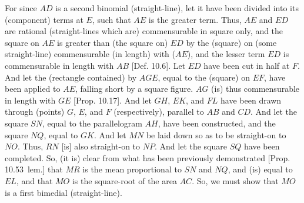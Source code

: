 \begin{Parallel}{}{}
{For since $AD$ is a second binomial (straight-line), let it have been divided
into its (component) terms at $E$, such that $AE$ is the greater term. Thus,
$AE$ and $ED$ are rational (straight-lines which are) commensurable
in square only, and the square on $AE$ is greater than (the square on)
$ED$ by the (square) on (some straight-line) commensurable (in length) with ($AE$),
and the lesser term $ED$ is commensurable in length with $AB$ [Def. 10.6].  Let $ED$ have been cut in half at $F$.
And let the (rectangle contained) by $AGE$, equal to the (square) on $EF$,
 have been applied to $AE$, falling short by a square figure. $AG$
(is) thus commensurable in length with $GE$ [Prop. 10.17]. And let $GH$, $EK$, and
$FL$ have been drawn through (points) $G$, $E$, and $F$ (respectively), parallel
to $AB$ and $CD$. And let the square $SN$, equal to the parallelogram
$AH$, have been constructed, and the square $NQ$, equal to
$GK$.  And let $MN$ be laid down so as to be straight-on to $NO$. Thus,
$RN$ [is] also straight-on to $NP$. And let the square $SQ$ have been
completed. So, (it is) clear from what has been previously
demonstrated [Prop. 10.53~lem.] that
$MR$ is the mean proportional to $SN$ and $NQ$, and (is) equal to
$EL$, and that $MO$ is the square-root of the area $AC$. So, we
must show that $MO$ is a first bimedial (straight-line).

}
\end{Parallel}
